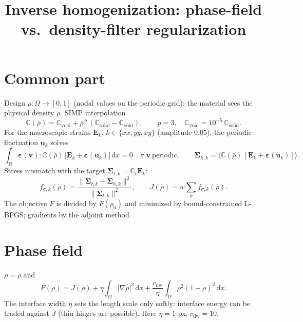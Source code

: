 \documentclass[11pt]{article}
\title{Inverse homogenization: phase-field vs.\ density-filter regularization}
\date{}
\newcommand{\bs}[1]{\boldsymbol{#1}}
\begin{document}
\maketitle

\section*{Common part}
Design $\rho:\Omega\to[0,1]$ (nodal values on the periodic grid); the material sees the physical density $\bar\rho$.
SIMP interpolation
\begin{equation}
  \mathbb{C}(\bar\rho) = \mathbb{C}_\mathrm{void} + \bar\rho^{\,p}\,(\mathbb{C}_\mathrm{solid}-\mathbb{C}_\mathrm{void}),
  \qquad p=3,\quad \mathbb{C}_\mathrm{void}=10^{-5}\,\mathbb{C}_\mathrm{solid}.
\end{equation}
For the macroscopic strains $\bs{E}_k$, $k\in\{xx,yy,xy\}$ (amplitude $0.05$), the periodic fluctuation $\bs{u}_k$ solves
\begin{equation}
  \int_\Omega \bs{\varepsilon}(\bs{v}) : \mathbb{C}(\bar\rho)\,\big[\bs{E}_k + \bs{\varepsilon}(\bs{u}_k)\big]\,\mathrm{d}x = 0
  \quad \forall\,\bs{v}\ \text{periodic},
  \qquad
  \bs{\Sigma}_{h,k} = \big\langle \mathbb{C}(\bar\rho)\,[\bs{E}_k + \bs{\varepsilon}(\bs{u}_k)] \big\rangle .
\end{equation}
Stress mismatch with the target $\bs{\Sigma}_{t,k} = \mathbb{C}_t\bs{E}_k$:
\begin{equation}
  f_{\sigma,k}(\bar\rho) = \frac{\|\bs{\Sigma}_{t,k}-\bs{\Sigma}_{h,k}\|^2}{\|\bs{\Sigma}_{t,k}\|^2},
  \qquad
  J(\bar\rho) = w \sum_k f_{\sigma,k}(\bar\rho).
\end{equation}
The objective $F$ is divided by $F(\rho_0)$ and minimized by bound-constrained L-BFGS; gradients by the adjoint method.

\section*{Phase field}
$\bar\rho = \rho$ and
\begin{equation}
  F(\rho) = J(\rho) + \eta \int_\Omega |\nabla\rho|^2\,\mathrm{d}x
  + \frac{c_\mathrm{dw}}{\eta}\int_\Omega \rho^2(1-\rho)^2\,\mathrm{d}x .
\end{equation}
The interface width $\eta$ sets the length scale only softly: interface energy can be traded against $J$
(thin hinges are possible). Here $\eta = 1$ px, $c_\mathrm{dw}=10$.
\end{document}
